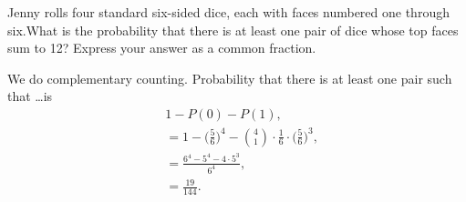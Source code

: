 \documentclass[11pt,twoside]{scrartcl}
\begin{document}
\begin{problem}
    Jenny rolls four standard six-sided dice, each with faces numbered one through six.What is the probability that there is at least one pair of dice whose top faces sum to 12? Express your answer as a common fraction.
    \begin{sketch}
        We do complementary counting. Probability that there is at least one pair such that \ldots is
        \begin{align*}
            &1 - P(0) - P(1), \\
            &= 1 - \Big(\frac{5}{6}\Big)^4 - \binom{4}{1}\cdot\frac{1}{6}\cdot\Big(\frac{5}{6}\Big)^3, \\
            &= \frac{6^4-5^4-4\cdot5^3}{6^4}, \\
            &= \boxed{\frac{19}{144}}.
        \end{align*}
    \end{sketch}
\end{problem}
\end{document}
